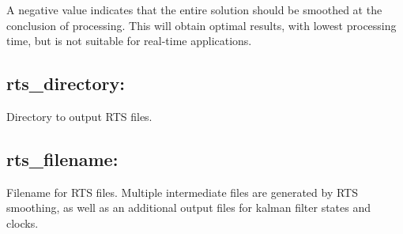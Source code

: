 A negative value indicates that the entire solution should be smoothed at the conclusion of processing. 
This will obtain optimal results, with lowest processing time, but is not suitable for real-time applications.

\subsection{rts\_directory:}
Directory to output RTS files.

\subsection{rts\_filename:}
Filename for RTS files. Multiple intermediate files are generated by RTS smoothing, as well as an additional output files for kalman filter states and clocks.
